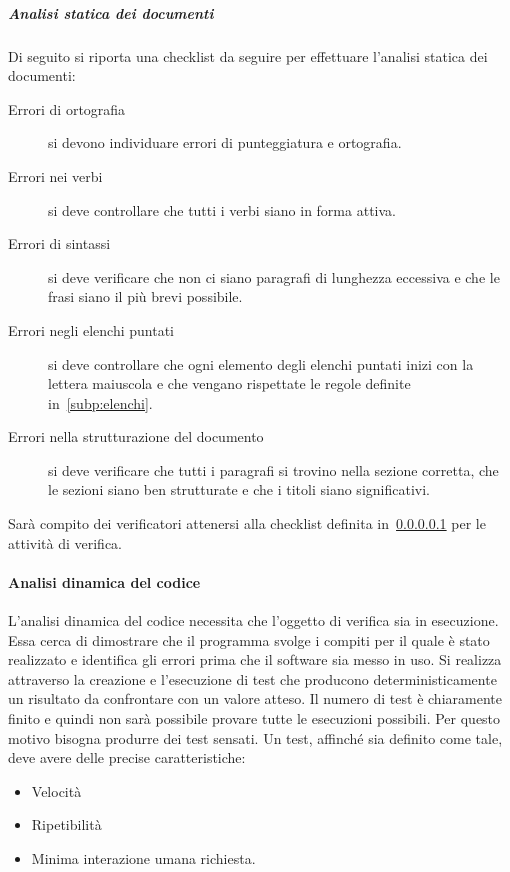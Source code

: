 \documentclass[../norme-di-progetto.tex]{subfiles}
\begin{document}
\subparagraph{Analisi statica dei documenti}%
\label{subp:analisi_statica_dei_documenti}
Di seguito si riporta una checklist da seguire per effettuare l'analisi statica dei documenti:

\begin{description}
  \item [Errori di ortografia] si devono individuare errori di punteggiatura e ortografia.
  \item [Errori nei verbi] si deve controllare che tutti i verbi siano in forma attiva.
  \item [Errori di sintassi] si deve verificare che non ci siano paragrafi di lunghezza eccessiva e che le frasi siano il più brevi possibile.
  \item [Errori negli elenchi puntati] si deve controllare che ogni elemento degli elenchi puntati inizi con la lettera maiuscola e che vengano rispettate le regole definite in~\ref{subp:elenchi}.
  \item [Errori nella strutturazione del documento] si deve verificare che tutti i paragrafi si trovino nella sezione corretta, che le sezioni siano ben strutturate e che i titoli siano significativi.
\end{description}

Sarà compito dei verificatori attenersi alla checklist definita in~\ref{subp:analisi_statica_dei_documenti} per le attività di verifica.

\paragraph{Analisi dinamica del codice}%
\label{par:analisi_dinamica_del_codice}
L'analisi dinamica del codice necessita che l'oggetto di verifica sia in esecuzione.
Essa cerca di dimostrare che il programma svolge i compiti per il quale è stato realizzato e identifica gli errori prima che il software sia messo in uso.
Si realizza attraverso la creazione e l'esecuzione di test che producono deterministicamente un risultato da confrontare con un valore atteso.
Il numero di test è chiaramente finito e quindi non sarà possibile provare tutte le esecuzioni possibili.
Per questo motivo bisogna produrre dei test sensati.
Un test, affinché sia definito come tale, deve avere delle precise caratteristiche:

\begin{itemize}
  \item Velocità
  \item Ripetibilità
  \item Minima interazione umana richiesta.
\end{itemize}
\end{document}
